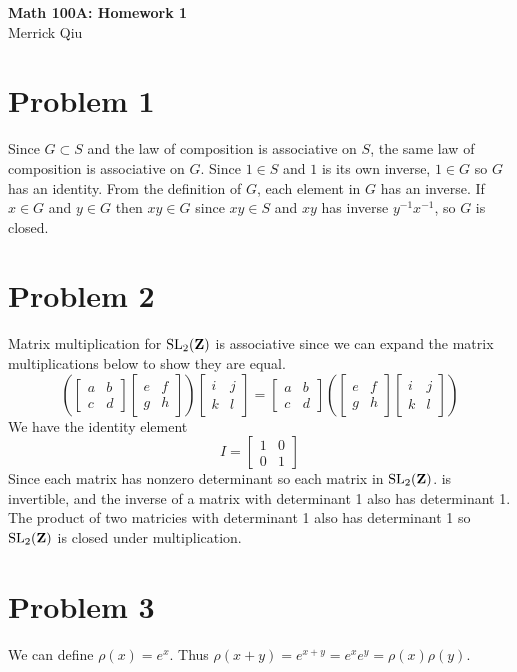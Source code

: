 \documentclass{article}
\begin{document}
\begin{center}
	\huge{\bf Math 100A: Homework 1} \\
	Merrick Qiu
\end{center}

\section*{Problem 1}
Since $G \subset S$ and the law of composition is associative on $S$,
the same law of composition is associative on $G$.
Since $1 \in S$ and $1$ is its own inverse, $1 \in G$ so $G$ has an identity.
From the definition of $G$, each element in $G$ has an inverse.
If $x \in G$ and $y \in G$ then $xy \in G$ since 
$xy \in S$ and $xy$ has inverse $y^{-1}x^{-1}$, so $G$ is closed.

\section*{Problem 2}
Matrix multiplication for $\mathrm{SL}_2(\bf{Z})$ is associative since 
we can expand the matrix multiplications below to show they are equal.
\[
	\left(
	\begin{bmatrix}
		a & b \\
		c & d
	\end{bmatrix}
	\begin{bmatrix}
		e & f \\
		g & h
	\end{bmatrix}
	\right)
	\begin{bmatrix}
		i & j \\
		k & l
	\end{bmatrix}
	=
	\begin{bmatrix}
		a & b \\
		c & d
	\end{bmatrix}
	\left(
	\begin{bmatrix}
		e & f \\
		g & h
	\end{bmatrix}
	\begin{bmatrix}
		i & j \\
		k & l
	\end{bmatrix}
	\right)
\]
We have the identity element 
\[
	I = 
	\begin{bmatrix}
		1 & 0 \\
		0 & 1
	\end{bmatrix}
\]
Since each matrix has nonzero determinant so each matrix in $\mathrm{SL}_2(\bf{Z})$.
is invertible, and the inverse of a matrix with determinant 1 also has determinant 1.
The product of two matricies with determinant 1 also has determinant 1 so 
$\mathrm{SL}_2(\bf{Z})$ is closed under multiplication.

\section*{Problem 3}
We can define $\rho(x) = e^x$.
Thus $\rho(x+y) = e^{x+y} = e^xe^y = \rho(x)\rho(y)$.
\end{document}
